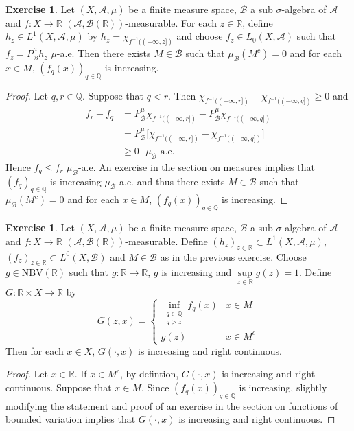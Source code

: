 \documentclass{book}
\theoremstyle{definition}
\newtheorem{ex}[definition]{Exercise}
\newcommand{\sig}{\sigma}
\newcommand{\Q}{\mathbb{Q}}
\newcommand{\R}{\mathbb{R}}
\newcommand{\MA}{\mathcal{A}}
\newcommand{\MB}{\mathcal{B}}
\DeclareMathOperator*{\0}{\mbf{0}}
\DeclareMathOperator*{\1}{\mbf{1}}
\newcommand{\NBV}{\text{NBV}}
\begin{document}
	\begin{ex}
		Let $(X, \MA, \mu)$ be a finite measure space, $\MB$ a sub $\sig$-algebra of $\MA$ and $f: X \rightarrow \R$ $(\MA, \MB(\R))$-measurable. For each $z \in \R$, define $h_z \in L^1(X, \MA, \mu)$ by $h_z = \chi_{f^{-1}((-\infty, z])}$ and choose $f_z \in L_0(X, \MA)$ such that $f_z = P^{\mu}_{\MB}h_z$ $\mu$-a.e. Then there exists $M \in \MB$ such that $\mu_{\MB}(M^c) = 0$ and for each $x \in M$, $(f_q(x))_{q \in \Q}$ is increasing.
	\end{ex}
	
	\begin{proof}
		Let $q, r \in \Q$. Suppose that $q < r$. Then $\chi_{f^{-1}((-\infty, r])} - \chi_{f^{-1}((-\infty, q])} \geq 0$ and
		\begin{align*}
			f_r - f_q 
			& = P^{\mu}_{\MB} \chi_{f^{-1}((-\infty, r])} - P^{\mu}_{\MB} \chi_{f^{-1}((-\infty, q])} \\
			& = P^{\mu}_{\MB} \bigg[ \chi_{f^{-1}((-\infty, r])} - \chi_{f^{-1}((-\infty, q])} \bigg] \\\
			& \geq 0 \text{ $\mu_{\MB}$-a.e.}
		\end{align*}
		Hence $f_q \leq f_r$ $\mu_{\MB}$-a.e. An exercise in the section on measures implies that $(f_q)_{q \in \Q}$ is increasing $\mu_{\MB}$-a.e. and thus there exists $M \in \MB$ such that $\mu_{\MB}(M^c) = 0$ and for each $x \in M$, $(f_q(x))_{q \in \Q}$ is increasing.
	\end{proof}
	
	\begin{ex}
		Let $(X, \MA, \mu)$ be a finite measure space, $\MB$ a sub $\sig$-algebra of $\MA$ and $f: X \rightarrow \R$ $(\MA, \MB(\R))$-measurable. Define $(h_z)_{z \in \R} \subset L^1(X, \MA, \mu)$, $(f_z)_{z \in \R} \subset L^0(X, \MB)$ and $M \in \MB$ as in the previous exercise. Choose $g \in \NBV(\R)$ such that $g: \R \rightarrow \R$, $g$ is increasing and $\sup\limits_{z \in \R} g(z) = 1$. Define $G: \R \times X \rightarrow \R$ by 
		\[
		G(z, x) = 
		\begin{cases}
			\inf\limits_{\substack{q \in \Q \\ q > z}}f_q(x) & x \in M \\
			g(z) & x \in M^c
		\end{cases}
		\] 
		Then for each $x \in X$, $G(\cdot, x)$ is increasing and right continuous.
	\end{ex}

	\begin{proof}
		Let $x \in \R$. If $x \in M^c$, by defintion, $G(\cdot, x)$ is increasing and right continuous. Suppose that $x \in M$. Since $(f_q(x))_{q \in \Q}$ is increasing, slightly modifying the statement and proof of an exercise in the section on functions of bounded variation implies that $G(\cdot, x)$ is increasing and right continuous.
	\end{proof}
\end{document}
